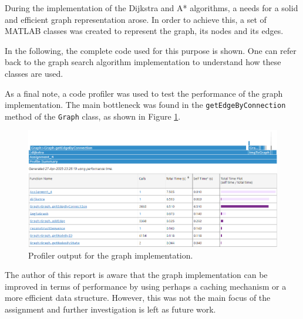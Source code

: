 \documentclass{assignment}
\begin{document}
During the implementation of the Dijkstra and A* algorithms, a needs for a solid and efficient graph representation arose.
In order to achieve this, a set of MATLAB classes was created to represent the graph, its nodes and its edges.

In the following, the complete code used for this purpose is shown.
One can refer back to the graph search algorithm implementation to understand how these classes are used.








As a final note, a code profiler was used to test the performance of the graph implementation.
The main bottleneck was found in the \texttt{getEdgeByConnection} method of the \texttt{Graph} class, as shown in Figure \ref{fig:graph_profiler}.

\begin{figure}[H]
    \centering
    \includegraphics[width=1.0\textwidth]{./img/code_profile.png}
    \caption{Profiler output for the graph implementation.}
    \label{fig:graph_profiler}
\end{figure}

The author of this report is aware that the graph implementation can be improved in terms of performance by using perhaps a caching mechanism or a more efficient data structure.
However, this was not the main focus of the assignment and further investigation is left as future work.
\end{document}
